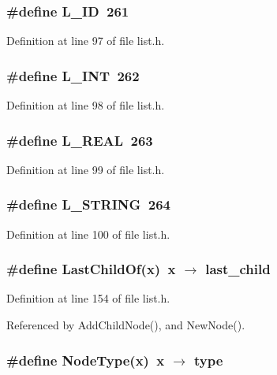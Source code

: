 \subsubsection{\setlength{\rightskip}{0pt plus 5cm}\#define L\_\-ID~261}\label{list_8h_18c71d842c217aa8a076bad758992164}




Definition at line 97 of file list.h.
\subsubsection{\setlength{\rightskip}{0pt plus 5cm}\#define L\_\-INT~262}\label{list_8h_65e9e9ff7b6f371dabc4ce35a201c976}




Definition at line 98 of file list.h.
\subsubsection{\setlength{\rightskip}{0pt plus 5cm}\#define L\_\-REAL~263}\label{list_8h_43900453a8567ae12822287b7be1a93d}




Definition at line 99 of file list.h.
\subsubsection{\setlength{\rightskip}{0pt plus 5cm}\#define L\_\-STRING~264}\label{list_8h_7fac69c283299c1ef115e1246a3e5d19}




Definition at line 100 of file list.h.
\subsubsection{\setlength{\rightskip}{0pt plus 5cm}\#define Last\-Child\-Of(x)~x $\rightarrow$ last\_\-child}\label{list_8h_5164c99e6d2939a07739621d249ac595}




Definition at line 154 of file list.h.

Referenced by Add\-Child\-Node(), and New\-Node().
\subsubsection{\setlength{\rightskip}{0pt plus 5cm}\#define Node\-Type(x)~x $\rightarrow$ type}\label{list_8h_a5ee94886c3393f60567e260563a27c8}




